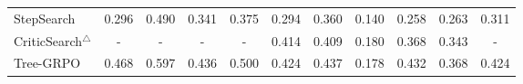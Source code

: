 \begin{table}[t]
{\begin{tabular}{l|ccc|c|cccc|c|c}
StepSearch 
& 0.296 & 0.490 & 0.341 & 0.375
& 0.294 & 0.360 & 0.140 & 0.258 & 0.263 & 0.311 \\
CriticSearch$^{\triangle}$       & - & - & - & - & 0.414 & 0.409 & 0.180 & 0.368 & 0.343 & - \\
Tree-GRPO & 0.468 & 0.597 & 0.436 & 0.500 & 0.424 & 0.437 & 0.178 & 0.432 & 0.368 & 0.424\\



\end{tabular}}
\end{table}
